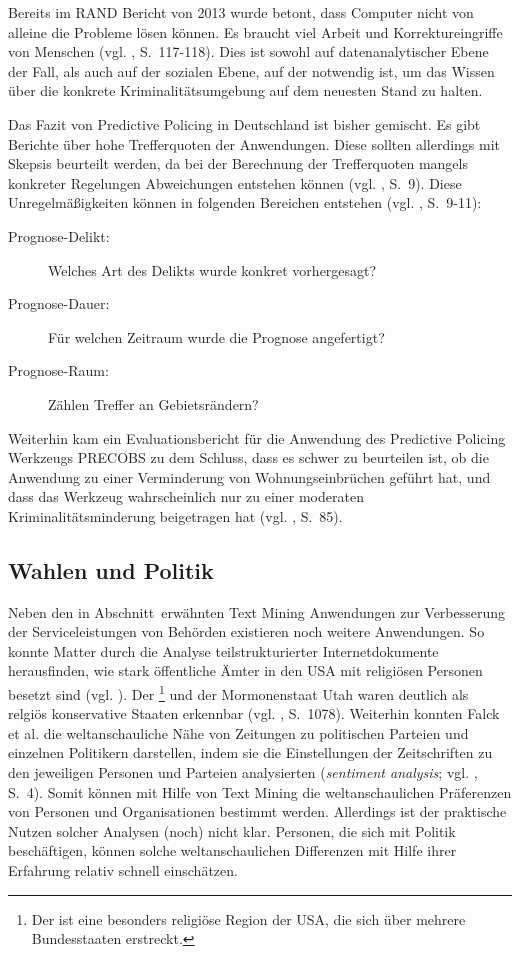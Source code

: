 Bereits im RAND Bericht von 2013 wurde betont, dass Computer nicht von alleine die Probleme
lösen können. Es braucht viel Arbeit und Korrektureingriffe von Menschen (vgl. \cite{Perry}, S.~117-118). 
Dies ist sowohl auf datenanalytischer Ebene der Fall, als auch auf der sozialen Ebene, auf der
\grqq{} notwendig ist, um das Wissen über die konkrete Kriminalitätsumgebung auf dem
neuesten Stand zu halten. 

Das Fazit von Predictive Policing in Deutschland ist bisher gemischt. Es gibt Berichte über hohe
Trefferquoten der Anwendungen. Diese sollten allerdings mit Skepsis beurteilt
werden, da bei der Berechnung der Trefferquoten mangels konkreter Regelungen Abweichungen
entstehen können (vgl. \cite{Bode}, S.~9).
Diese Unregelmäßigkeiten können in folgenden Bereichen entstehen (vgl. \cite{Bode}, S.~9-11):

\begin{description}
\item[Prognose-Delikt:] Welches Art des Delikts wurde konkret vorhergesagt?
\item[Prognose-Dauer:] Für welchen Zeitraum wurde die Prognose angefertigt?
\item[Prognose-Raum:] Zählen Treffer an Gebietsrändern?
\end{description}

Weiterhin kam ein Evaluationsbericht für die Anwendung des Predictive Policing Werkzeugs PRECOBS
zu dem Schluss, dass es schwer zu beurteilen ist, ob die Anwendung zu einer Verminderung von
Wohnungseinbrüchen geführt hat, und dass das Werkzeug wahrscheinlich nur zu einer moderaten Kriminalitätsminderung
beigetragen hat (vgl. \cite{Gerstner}, S.~85).  

\subsection{Wahlen und Politik}

Neben den in Abschnitt~\xcom erwähnten Text Mining Anwendungen zur Verbesserung der Serviceleistungen
von Behörden existieren noch weitere \grqq{} Anwendungen. So konnte Matter durch
die Analyse teilstrukturierter Internetdokumente herausfinden, wie stark öffentliche Ämter in den USA
mit religiösen Personen besetzt sind (vgl. \cite{Matter}). Der \grqq{}\footnote{
Der  ist eine besonders religiöse Region der USA, die sich über mehrere Bundesstaaten erstreckt.
} und der Mormonenstaat Utah waren deutlich als relgiös konservative Staaten erkennbar (vgl. \cite{Matter}, S.~1078).
Weiterhin konnten Falck et al. die weltanschauliche Nähe von Zeitungen zu politischen Parteien und einzelnen Politikern
darstellen, indem sie die Einstellungen der Zeitschriften zu den jeweiligen Personen und Parteien analysierten
(\emph{sentiment analysis}; vgl. \cite{Falck}, S.~4). Somit können mit Hilfe von Text Mining die weltanschaulichen Präferenzen
von Personen und Organisationen bestimmt werden. Allerdings ist der praktische Nutzen solcher Analysen (noch) nicht klar.
Personen, die sich mit Politik beschäftigen, können solche weltanschaulichen Differenzen mit Hilfe ihrer Erfahrung relativ
schnell einschätzen.

